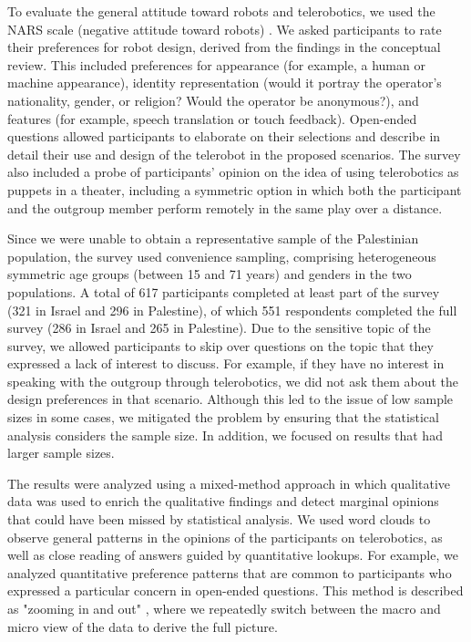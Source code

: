 \documentclass[dissertation,math,vertlayout,pdfa,colorlinks,nologo]{aaltoseries}
\begin{document}
To evaluate the general attitude toward robots and telerobotics, we used the NARS scale (negative attitude toward robots) \cite{syrdalNegativeAttitudesRobots2009, tsuiUsingNegativeAttitude2010}. We asked participants to rate their preferences for robot design, derived from the findings in the conceptual review. This included preferences for appearance (for example, a human or machine appearance), identity representation (would it portray the operator's nationality, gender, or religion? Would the operator be anonymous?), and features (for example, speech translation or touch feedback). Open-ended questions allowed participants to elaborate on their selections and describe in detail their use and design of the telerobot in the proposed scenarios. The survey also included a probe of participants' opinion on the idea of using telerobotics as puppets in a theater, including a symmetric option in which both the participant and the outgroup member perform remotely in the same play over a distance.

Since we were unable to obtain a representative sample of the Palestinian population, the survey used convenience sampling, comprising heterogeneous symmetric age groups (between 15 and 71 years) and genders in the two populations. A total of 617 participants completed at least part of the survey (321 in Israel and 296 in Palestine), of which 551 respondents completed the full survey (286 in Israel and 265 in Palestine). Due to the sensitive topic of the survey, we allowed participants to skip over questions on the topic that they expressed a lack of interest to discuss. For example, if they have no interest in speaking with the outgroup through telerobotics, we did not ask them about the design preferences in that scenario. Although this led to the issue of low sample sizes in some cases, we mitigated the problem by ensuring that the statistical analysis considers the sample size. In addition, we focused on results that had larger sample sizes.

The results were analyzed using a mixed-method approach \cite{creswellMixedmethodResearchIntroduction1999} in which qualitative data was used to enrich the qualitative findings and detect marginal opinions that could have been missed by statistical analysis. We used word clouds to observe general patterns in the opinions of the participants on telerobotics, as well as close reading of answers guided by quantitative lookups. For example, we analyzed quantitative preference patterns that are common to participants who expressed a particular concern in open-ended questions. This method is described as "zooming in and out" \cite{busch-jensenZoomingZoomingOut2019, nicoliniZoomingOutStudying2009}, where we repeatedly switch between the macro and micro view of the data to derive the full picture.
\end{document}
